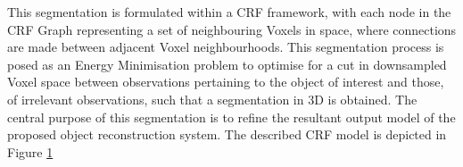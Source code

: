 This segmentation is formulated within a CRF framework, with each node in the
CRF Graph representing a set of neighbouring Voxels in space, where connections
are made between adjacent Voxel neighbourhoods. This segmentation process is
posed as an Energy Minimisation problem to optimise for a cut in downsampled
Voxel space between observations pertaining to the object of interest and those,
of irrelevant observations, such that a segmentation in 3D is obtained. The
central purpose of this segmentation is to refine the resultant output model of
the proposed object reconstruction system. The described CRF model is depicted
in Figure \ref{fig:probobj_crf}

\begin{figure}[h]
  \label{fig:probobj_crf}
  \centering
\end{figure}
